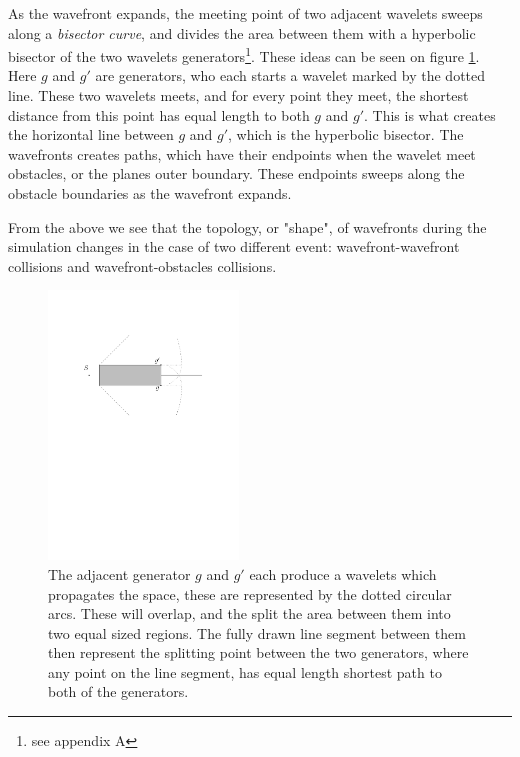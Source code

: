 As the wavefront expands, the meeting point of two adjacent wavelets sweeps along a 
\textit{bisector curve}, and divides the area between them with a hyperbolic bisector 
of the two wavelets generators\footnote{see appendix A}. These ideas can be seen on 
figure \ref{fig:bisectorex}. Here $g$ and $g'$ are generators, who each starts a 
wavelet marked by the dotted line. These two wavelets meets, and for every point they 
meet, the shortest distance from this point has equal length to both $g$ and $g'$. 
This is what creates the horizontal line between $g$ and $g'$, which is the 
hyperbolic bisector. The wavefronts creates paths, which have their endpoints when 
the wavelet meet obstacles, or the planes outer boundary. These endpoints sweeps 
along the obstacle boundaries as the wavefront expands. 

From the above we see that the topology, or "shape", of wavefronts during the 
simulation changes in the case of two different event: wavefront-wavefront collisions 
 and wavefront-obstacles collisions. 

\begin{figure}[H]
	\centering
	\includegraphics[width=0.45\textwidth]{figures/bisectorex.pdf}
	\caption{The adjacent generator $g$ and $g'$ each produce a wavelets which propagates 
    the space, these are represented by the dotted circular arcs. These will overlap, 
    and the split the area between them into two equal sized regions. The fully drawn 
    line segment between them then represent the splitting point between the two generators, 
    where any point on the line segment, has equal length shortest path to both of the 
    generators.}
	\label{fig:bisectorex}
\end{figure}

